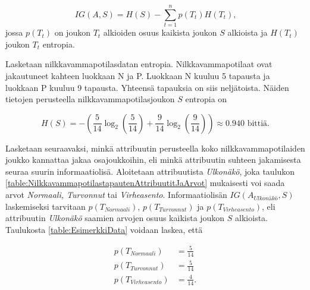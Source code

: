 \documentclass[12pt,finnish]{tktltiki2}
\theoremstyle{definition}
\theoremstyle{remark}
\begin{document}
\begin{equation}
\label{eq:informationGain}
IG(A,S) = H(S) -\sum_{t = 1}^{n} p(T_t)H(T_t) \mbox{,}
\end{equation}
jossa $p(T_t)$ on joukon $T_t$ alkioiden osuus kaikista joukon $S$ alkioista ja $H(T_t)$ joukon $T_t$
entropia. 

Lasketaan nilkkavammapotilasdatan entropia. Nilkkavammapotilaat ovat jakautuneet kahteen luokkaan N ja P.
Luokkaan N kuuluu 5 tapausta ja luokkaan P kuuluu 9 tapausta. Yhteensä tapauksia on siis neljätoista. Näiden
tietojen perusteella nilkkavammapotilasjoukon $S$ entropia on

\[ H(S) = -\left(\frac{5}{14}\log_2\left(\frac{5}{14}\right) + \frac{9}{14}\log_2\left(\frac{9}{14}\right)\right) \approx 0.940 \mbox{ bittiä.} \] 

Lasketaan seuraavaksi, minkä attribuutin perusteella koko nilkkavammapotilaiden joukko kannattaa jakaa osajoukkoihin,
eli minkä attribuutin suhteen jakamisesta seuraa suurin informaatiolisä. Aloitetaan attribuutista \textit{Ulkonäkö},
joka taulukon \ref{table:NilkkavammapotilastapautenAttribuutitJaArvot} mukaisesti
voi saada arvot \textit{Normaali, Turvonnut} tai \textit{Virheasento}. Informaatiolisän $IG(A_{Ulkonäkö},S)$ laskemiseksi
tarvitaan $p(T_{Normaali})$, $p(T_{Turvonnut})$ ja $p(T_{Virheasento})$, eli attribuutin \textit{Ulkonäkö} saamien arvojen
osuus kaikista joukon $S$ alkioista. Taulukosta \ref{table:EsimerkkiData} voidaan laskea, että

\begin{equation*}
\begin{split}
p(T_{Normaali}) &= \frac{5}{14} \\
p(T_{Turvonnut}) &= \frac{5}{14} \\
p(T_{Virheasento}) &= \frac{4}{14} \mbox{.}
\end{split}
\end{equation*}

\end{document}
